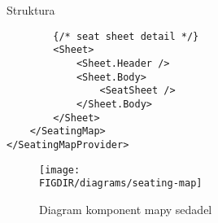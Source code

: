 \begin{subsection}{Struktura}
\begin{listing}[H]
\begin{verbatim}
		{/* seat sheet detail */}
		<Sheet>
			<Sheet.Header />
			<Sheet.Body>
				<SeatSheet />
			</Sheet.Body>
		</Sheet>
	</SeatingMap>
</SeatingMapProvider>
        \end{verbatim}
        \caption{Struktura komponent mapy sedadel}
        \label{listing:seating-map-structure}
    \end{listing}

    \begin{figure}[H]
        \centering
        \texttt{[image: \\FIGDIR/diagrams/seating-map]}
        \caption{Diagram komponent mapy sedadel}
        \label{fig:seat-map-structure}
    \end{figure}
\end{subsection}

